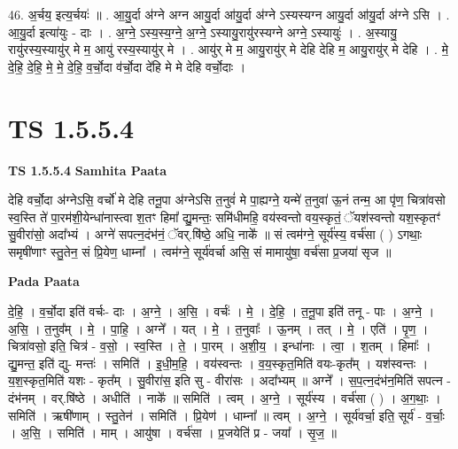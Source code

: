 \documentclass[17pt]{extarticle}
\begin{document}
46. अ॒र्चय॒ इत्य॒र्चयः॑ ॥ . आ॒यु॒र्दा अ॑ग्ने अग्न आयु॒र्दा आ॑यु॒र्दा अ॑ग्ने ऽस्यस्यग्न आयु॒र्दा आ॑यु॒र्दा अ॑ग्ने ऽसि । . आ॒यु॒र्दा इत्या॑युः - दाः । . अ॒ग्ने॒ ऽस्य॒स्य॒ग्ने॒ अ॒ग्ने॒ ऽस्यायु॒रायु॑रस्यग्ने अग्ने॒ ऽस्यायुः॑ । . अ॒स्यायु॒ रायु॑रस्य॒स्यायु॑र् मे म॒ आयु॑ रस्य॒स्यायु॑र् मे । . आयु॑र् मे म॒ आयु॒रायु॑र् मे देहि देहि म॒ आयु॒रायु॑र् मे देहि । . मे॒ दे॒हि॒ दे॒हि॒ मे॒ मे॒ दे॒हि॒ व॒र्चो॒दा व॑र्चो॒दा दे॑हि मे मे देहि वर्चो॒दाः । \newline
\pagebreak
{}

\section{ TS 1.5.5.4 }

\textbf{TS 1.5.5.4 } \newline
\textbf{Samhita Paata} \newline

देहि वर्चो॒दा अ॑ग्नेऽसि॒ वर्चो॑ मे देहि तनू॒पा अ॑ग्नेऽसि त॒नुवं॑ मे पा॒ह्यग्ने॒ यन्मे॑ त॒नुवा॑ ऊ॒नं तन्म॒ आ पृ॑ण॒ चित्रा॑वसो स्व॒स्ति ते॑ पा॒रम॑शी॒येन्धा॑नास्त्वा श॒तꣳ हिमा᳚ द्यु॒मन्तः॒ समि॑धीमहि॒ वय॑स्वन्तो वय॒स्कृतं॒ ॅयश॑स्वन्तो यश॒स्कृतꣳ॑ सु॒वीरा॑सो॒ अदा᳚भ्यं । अग्ने॑ सपत्न॒दंभ॑नं॒ ॅवर्.षि॑ष्ठे॒ अधि॒ नाके᳚ ॥ सं त्वम॑ग्ने॒ सूर्य॑स्य॒ वर्च॑सा ( ) ऽगथाः॒ समृषी॑णाꣳ स्तु॒तेन॒ सं प्रि॒येण॒ धाम्ना᳚ । त्वम॑ग्ने॒ सूर्य॑वर्चा असि॒ सं मामायु॑षा॒ वर्च॑सा प्र॒जया॑ सृज ॥ \newline

\textbf{Pada Paata} \newline

दे॒हि॒ । व॒र्चो॒दा इति॑ वर्चः- दाः । अ॒ग्ने॒ । अ॒सि॒ । वर्चः॑ । मे॒ । दे॒हि॒ । त॒नू॒पा इति॑ तनू - पाः । अ॒ग्ने॒ । अ॒सि॒ । त॒नुव᳚म् । मे॒ । पा॒हि॒ । अग्ने᳚ । यत् । मे॒ । त॒नुवाः᳚ । ऊ॒नम् । तत् । मे॒ । एति॑ । पृ॒ण॒ । चित्रा॑वसो॒ इति॒ चित्र॑ - व॒सो॒ । स्व॒स्ति । ते॒ । पा॒रम् । अ॒शी॒य॒ । इन्धा॑नाः । त्वा॒ । श॒तम् । हिमाः᳚ । द्यु॒मन्त॒ इति॑ द्यु- मन्तः॑ । समिति॑ । इ॒धी॒म॒हि॒ । वय॑स्वन्तः । व॒य॒स्कृत॒मिति॑ वयः-कृत᳚म् । यश॑स्वन्तः । य॒श॒स्कृत॒मिति॑ यशः - कृत᳚म् । सु॒वीरा॑स॒ इति सु - वीरा॑सः । अदा᳚भ्यम् ॥ अग्ने᳚ । स॒प॒त्न॒दंभ॑न॒मिति॑ सपत्न - दंभ॑नम् । वर्.षि॑ष्ठे । अधीति॑ । नाके᳚ ॥ समिति॑ । त्वम् । अ॒ग्ने॒ । सूर्य॑स्य । वर्च॑सा ( ) । अ॒ग॒थाः॒ । समिति॑ । ऋषी॑णाम् । स्तु॒तेन॑ । समिति॑ । प्रि॒येण॑ । धाम्ना᳚ ॥ त्वम् । अ॒ग्ने॒ । सूर्य॑वर्चा॒ इति॒ सूर्य॑ - व॒र्चाः॒ । अ॒सि॒ । समिति॑ । माम् । आयु॑षा । वर्च॑सा । प्र॒जयेति॑ प्र - जया᳚ । सृ॒ज॒ ॥  \newline
\end{document}
